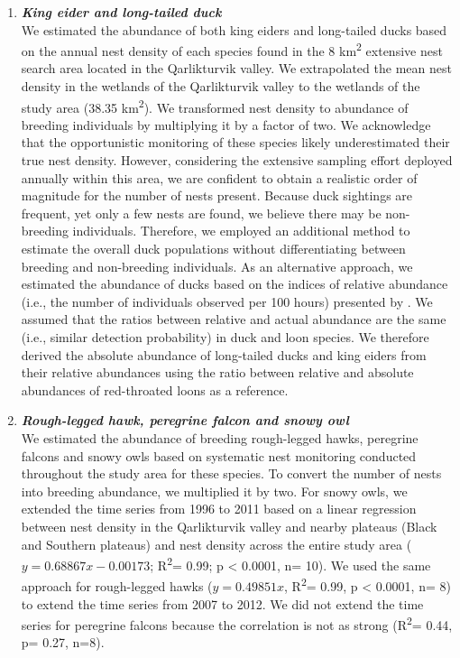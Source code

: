 \documentclass[a4paper,twoside,12pt]{article}
\begin{document}
\begin{enumerate}[label=\alph*.]
                \item[] \textit{\textbf{King eider and long-tailed duck}}\\
                We estimated the abundance of both king eiders and long-tailed ducks based on the annual nest density of each species found in the 8 km\textsuperscript{2} extensive nest search area located in the Qarlikturvik valley. We extrapolated the mean nest density in the wetlands of the Qarlikturvik valley to the wetlands of the study area (38.35 km\textsuperscript{2}). We transformed nest density to abundance of breeding individuals by multiplying it by a factor of two. We acknowledge that the opportunistic monitoring of these species likely underestimated their true nest density. However, considering the extensive sampling effort deployed annually within this area, we are confident to obtain a realistic order of magnitude for the number of nests present. Because duck sightings are frequent, yet only a few nests are found, we believe there may be non-breeding individuals. Therefore, we employed an additional method to estimate the overall duck populations without differentiating between breeding and non-breeding individuals. 
As an alternative approach, we estimated the abundance of ducks based on the indices of relative abundance (i.e., the number of individuals observed per 100 hours) presented by \citet{gauthier2024a}. We assumed that the ratios between relative and actual abundance are the same (i.e., similar detection probability) in duck and loon species. We therefore derived the absolute abundance of long-tailed ducks and king eiders from their relative abundances using the ratio between relative and absolute abundances of red-throated loons as a reference.
                                
                                
                \item[] \textit{\textbf{Rough-legged hawk, peregrine falcon and snowy owl}} \\
                We estimated the abundance of breeding rough-legged hawks, peregrine falcons and snowy owls based on systematic nest monitoring conducted throughout the study area for these species. To convert the number of nests into breeding abundance, we multiplied it by two. For snowy owls, we extended the time series from 1996 to 2011 based on a linear regression between nest density in the Qarlikturvik valley and nearby plateaus (Black and Southern plateaus) and nest density across the entire study area ($y= 0.68867x -0.00173$; R\textsuperscript{2}= 0.99; p < 0.0001, n= 10). We used the same approach for rough-legged hawks ($y=0.49851x$, R\textsuperscript{2}= 0.99, p < 0.0001, n= 8) to extend the time series from 2007 to 2012. We did not extend the time series for peregrine falcons because the correlation is not as strong (R\textsuperscript{2}= 0.44, p= 0.27, n=8).
                

\end{enumerate}
\end{document}

